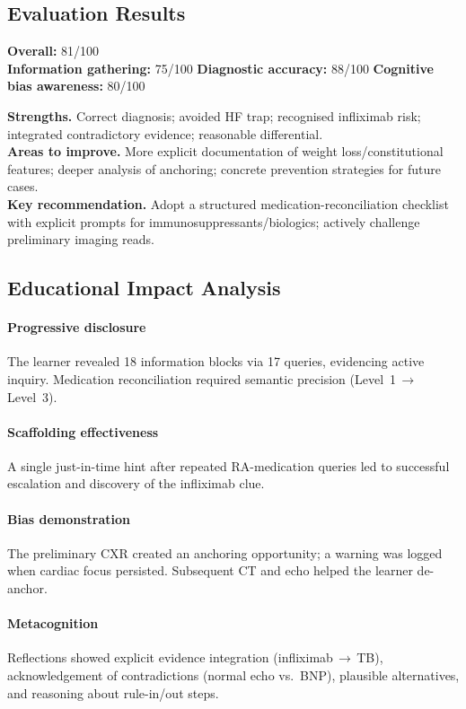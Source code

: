 \subsection{Evaluation Results}

\noindent\textbf{Overall:} 81/100 \\
\textbf{Information gathering:} 75/100 \quad
\textbf{Diagnostic accuracy:} 88/100 \quad
\textbf{Cognitive bias awareness:} 80/100

\smallskip
\noindent\textbf{Strengths.} Correct diagnosis; avoided HF trap; recognised infliximab risk; integrated contradictory evidence; reasonable differential. \\
\textbf{Areas to improve.} More explicit documentation of weight loss/constitutional features; deeper analysis of anchoring; concrete prevention strategies for future cases. \\
\textbf{Key recommendation.} Adopt a structured medication-reconciliation checklist with explicit prompts for immunosuppressants/biologics; actively challenge preliminary imaging reads.

\subsection{Educational Impact Analysis}

\paragraph{Progressive disclosure}
The learner revealed 18 information blocks via 17 queries, evidencing active inquiry. Medication reconciliation required semantic precision (Level~1\,\(\rightarrow\)\,Level~3).

\paragraph{Scaffolding effectiveness}
A single just-in-time hint after repeated RA-medication queries led to successful escalation and discovery of the infliximab clue.

\paragraph{Bias demonstration}
The preliminary CXR created an anchoring opportunity; a warning was logged when cardiac focus persisted. Subsequent CT and echo helped the learner de-anchor.

\paragraph{Metacognition}
Reflections showed explicit evidence integration (infliximab\,\(\rightarrow\)\,TB), acknowledgement of contradictions (normal echo vs.\ BNP), plausible alternatives, and reasoning about rule-in/out steps.

